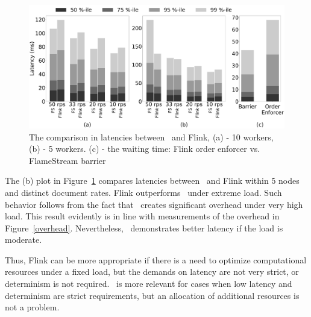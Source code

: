\begin{figure}[ht]
  \centering
  \includegraphics[width=\textwidth]{pics/comp-index-quantiles}
  \caption{The comparison in latencies between \FlameStream\ and Flink, (a) - 10 workers, (b) - 5 workers. (c) - the waiting time: Flink order enforcer vs. FlameStream barrier}
  \label {fs-index-quantiles}
\end{figure}


The (b) plot in Figure~\ref{fs-index-quantiles} 
compares  latencies between \FlameStream\ and Flink within 5 nodes and distinct document rates. 
Flink outperforms \FlameStream\ under extreme load. 
Such behavior follows from the fact that \FlameStream\ creates significant overhead under very high load.
This result evidently is in line with measurements of the overhead in Figure~\ref{overhead}. 
Nevertheless,  \FlameStream\ demonstrates better latency if the load is moderate.

Thus, Flink can be more appropriate if there is a need to optimize computational resources under a fixed load, but the demands on latency are not very strict, or determinism is not required. \FlameStream\ is more relevant for cases when low latency and determinism are strict requirements, but an allocation of additional resources is not a problem.  


